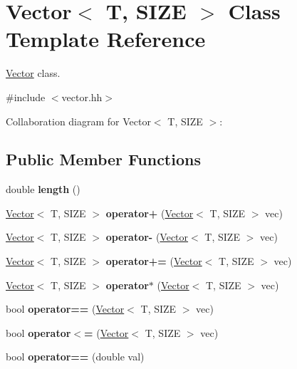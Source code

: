 \hypertarget{class_vector}{}\section{Vector$<$ T, S\+I\+ZE $>$ Class Template Reference}
\label{class_vector}


\hyperlink{class_vector}{Vector} class.  




{\ttfamily \#include $<$vector.\+hh$>$}



Collaboration diagram for Vector$<$ T, S\+I\+ZE $>$\+:
\subsection*{Public Member Functions}
\begin{DoxyCompactItemize}
\item 
\mbox{\label{class_vector_a5831bf2c226b4a3aea6437b3f8718984}} 
double {\bfseries length} ()
\item 
\mbox{\label{class_vector_acb7462a9a030034f29ab3e771d32c2f2}} 
\hyperlink{class_vector}{Vector}$<$ T, S\+I\+ZE $>$ {\bfseries operator+} (\hyperlink{class_vector}{Vector}$<$ T, S\+I\+ZE $>$ vec)
\item 
\mbox{\label{class_vector_a899883cedb76f027b44536bdfac2b8da}} 
\hyperlink{class_vector}{Vector}$<$ T, S\+I\+ZE $>$ {\bfseries operator-\/} (\hyperlink{class_vector}{Vector}$<$ T, S\+I\+ZE $>$ vec)
\item 
\mbox{\label{class_vector_acafd19514a992d61a93bfc403e772d5b}} 
\hyperlink{class_vector}{Vector}$<$ T, S\+I\+ZE $>$ {\bfseries operator+=} (\hyperlink{class_vector}{Vector}$<$ T, S\+I\+ZE $>$ vec)
\item 
\mbox{\label{class_vector_a64c47df33ab373d2f7cb34e7aa52910a}} 
\hyperlink{class_vector}{Vector}$<$ T, S\+I\+ZE $>$ {\bfseries operator$\ast$} (\hyperlink{class_vector}{Vector}$<$ T, S\+I\+ZE $>$ vec)
\item 
\mbox{\label{class_vector_a1021e667bce57501aaec990474e8457e}} 
bool {\bfseries operator==} (\hyperlink{class_vector}{Vector}$<$ T, S\+I\+ZE $>$ vec)
\item 
\mbox{\label{class_vector_a58cb11bbaa2c318ff23118bcd5d2a8dd}} 
bool {\bfseries operator$<$=} (\hyperlink{class_vector}{Vector}$<$ T, S\+I\+ZE $>$ vec)
\item 
\mbox{\label{class_vector_ae61f27caceddccbfd2b82e7fb1f3e5a4}} 
bool {\bfseries operator==} (double val)
\end{DoxyCompactItemize}
